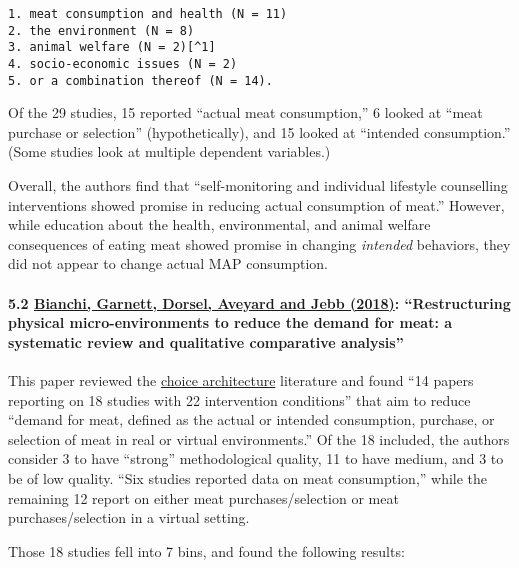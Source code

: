 \documentclass[
  letterpaper,
  DIV=11,
  numbers=noendperiod]{scrartcl}
\let\oldparagraph\paragraph
\renewcommand{\paragraph}[1]{\oldparagraph{#1}\mbox{}}
\begin{document}
\begin{verbatim}
1. meat consumption and health (N = 11) 
2. the environment (N = 8) 
3. animal welfare (N = 2)[^1]
4. socio-economic issues (N = 2) 
5. or a combination thereof (N = 14). 
\end{verbatim}

Of the 29 studies, 15 reported ``actual meat consumption,'' 6 looked at
``meat purchase or selection'' (hypothetically), and 15 looked at
``intended consumption.'' (Some studies look at multiple dependent
variables.)

Overall, the authors find that ``self-monitoring and individual
lifestyle counselling interventions showed promise in reducing actual
consumption of meat.'' However, while education about the health,
environmental, and animal welfare consequences of eating meat showed
promise in changing \emph{intended} behaviors, they did not appear to
change actual MAP consumption.

\paragraph{\texorpdfstring{5.2
\href{https://pubmed.ncbi.nlm.nih.gov/30177007/}{Bianchi, Garnett,
Dorsel, Aveyard and Jebb (2018)}: ``Restructuring physical
micro-environments to reduce the demand for meat: a systematic review
and qualitative comparative
analysis''}{5.2 Bianchi, Garnett, Dorsel, Aveyard and Jebb (2018): ``Restructuring physical micro-environments to reduce the demand for meat: a systematic review and qualitative comparative analysis''}}\label{bianchi-garnett-dorsel-aveyard-and-jebb-2018-restructuring-physical-micro-environments-to-reduce-the-demand-for-meat-a-systematic-review-and-qualitative-comparative-analysis}

This paper reviewed the
\href{https://en.wikipedia.org/wiki/Choice_architecture}{choice
architecture} literature and found ``14 papers reporting on 18 studies
with 22 intervention conditions'' that aim to reduce ``demand for meat,
defined as the actual or intended consumption, purchase, or selection of
meat in real or virtual environments.'' Of the 18 included, the authors
consider 3 to have ``strong'' methodological quality, 11 to have medium,
and 3 to be of low quality. ``Six studies reported data on meat
consumption,'' while the remaining 12 report on either meat
purchases/selection or meat purchases/selection in a virtual setting.

Those 18 studies fell into 7 bins, and found the following results:
\end{document}

